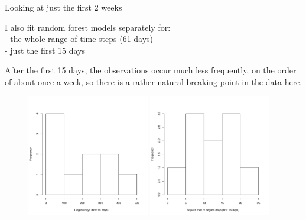 \documentclass{beamer}
\begin{document}
\begin{frame}{Looking at just the first 2 weeks}

  {\scriptsize
    \noindent I also fit random forest models separately for:\\
    - the whole range of time steps (61 days)\\
    - just the first 15 days

    \vspace{0.05in}
    
    \noindent After the first 15 days, the observations occur much
    less frequently, on the order of about once a week, so there is a
    rather natural breaking point in the data here.
    
\begin{figure}
  \includegraphics[width=2.1in]{degdays_first_two_weeks_hist}
  \includegraphics[width=2.1in]{sqrt_degdays_first_two_weeks_hist}
\end{figure}
  }
  
\end{frame}
\end{document}
